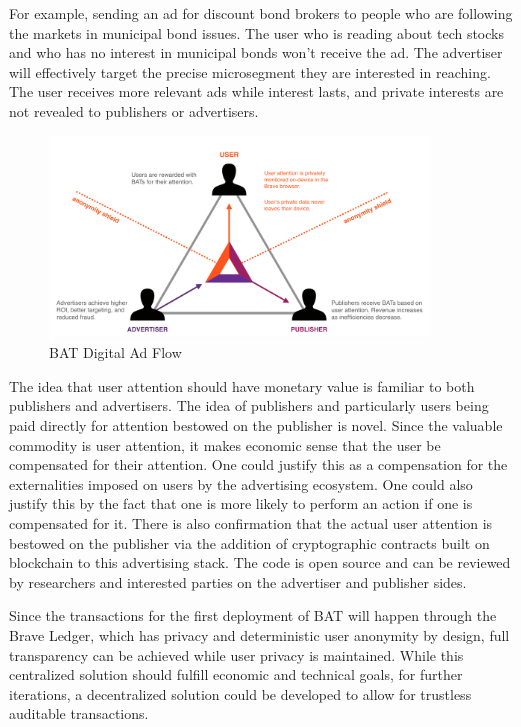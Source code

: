 \documentclass[11pt]{article}
\begin{document}
For example, sending an ad for discount bond brokers to people who are
following the markets in municipal bond issues. The user who is
reading about tech stocks and who has no interest in municipal bonds
won't receive the ad. The advertiser will effectively target the
precise microsegment they are interested in reaching. The user receives more relevant ads while interest lasts, and private interests are not revealed to publishers or advertisers.


\begin{figure}
\begin{center}
\includegraphics[width=0.9\textwidth]{BAT_digital_ad_flow.png}
\caption{\textrm{BAT} Digital Ad Flow}
\end{center}
\end{figure}



The idea that user attention should have monetary value is familiar to
both publishers and advertisers. The idea of publishers and
particularly users being paid directly for attention bestowed on the
publisher is novel. Since the valuable commodity is user attention, it
makes economic sense that the user be compensated for their
attention. One could justify this as a compensation for the
externalities imposed on users by the advertising ecosystem. One could
also justify this by the fact that one is more likely to perform an
action if one is compensated for it. There is also confirmation that
the actual user attention is bestowed on the publisher via the
addition of cryptographic contracts built on blockchain to this
advertising stack. The code is open source and can be reviewed by
researchers and interested parties on the advertiser and publisher sides.

Since the transactions for the first deployment of \textrm{BAT} will happen
through the Brave Ledger, which has privacy and deterministic user
anonymity by design, full transparency can be achieved while user privacy is maintained. While this 
centralized solution should fulfill economic and technical goals, for further iterations, a 
decentralized solution could be developed to allow for trustless
auditable transactions.
\end{document}
